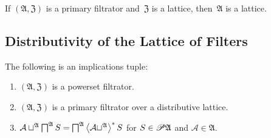 \begin{cor}\label{f-is-distr}
If $(\mathfrak{A},\mathfrak{Z})$ is a primary filtrator
and~$\mathfrak{Z}$ is a lattice,
then~$\mathfrak{A}$ is a lattice.
\end{cor}

\subsection{Distributivity of the Lattice of Filters}
\begin{thm}
\label{f-inf-assc}The following is an implications tuple:
\begin{enumerate}
\item \label{inf-assc-p}$(\mathfrak{A},\mathfrak{Z})$ is a powerset filtrator.
\item \label{inf-assc-prim}$(\mathfrak{A},\mathfrak{Z})$ is a primary
filtrator over a distributive lattice.
\item \label{inf-assc-conc}$\mathcal{A}\sqcup^{\mathfrak{A}}\bigsqcap^{\mathfrak{A}}S=\bigsqcap^{\mathfrak{A}}\left\langle \mathcal{A}\sqcup^{\mathfrak{A}}\right\rangle ^{\ast}S$
for $S\in\mathscr{P}\mathfrak{A}$ and $\mathcal{A}\in\mathfrak{A}$.
\end{enumerate}
\end{thm}
